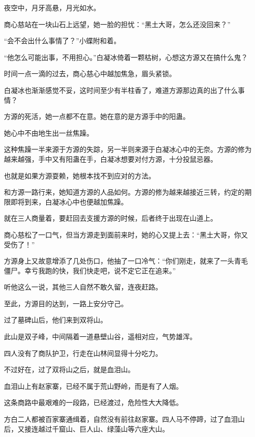 
\begin{this_body}



夜空中，月牙高悬，月光如水。

商心慈站在一块山石上远望，她一脸的担忧：“黑土大哥，怎么还没回来？”

“会不会出什么事情了？”小蝶附和着。

“他怎么可能出事，不用担心。”白凝冰倚着一颗枯树，心想这方源又在搞什么鬼？

时间一点一滴的过去，商心慈心中越加焦急，眉头紧锁。

白凝冰也渐渐感觉不妥，这时间至少有半柱香了，难道方源那边真的出了什么事情？

方源的死活，她一点都不在意。她在意的是方源手中的阳蛊。

她心中不由地生出一丝焦躁。

这种焦躁一半来源于方源的失踪，另一半则来源于白凝冰心中的无奈。方源的修为越来越强，手中又有阳蛊在手，白凝冰想要对付方源，十分投鼠忌器。

也就是如果方源耍赖，她根本找不到应对的方法。

和方源一路行来，她知道方源的人品如何。方源的修为越来越接近三转，约定的期限即将到来，白凝冰心中也便越加焦躁。

就在三人商量着，要赶回去支援方源的时候，后者终于出现在山道上。

商心慈松了一口气，但当方源走到面前来时，她的心又提上去：“黑土大哥，你又受伤了！”

方源身上又故意增添了几处伤口，他抽了一口冷气：“你们刚走，就来了一头青毛僵尸。幸亏我跑的快，我们快走吧，说不定它正在追来。”

听他这么一说，其他三人自然不敢久留，连夜赶路。

至此，方源目的达到，一路上安分守己。

过了墓碑山后，他们来到双将山。

此山是双子峰，中间隔着一道悬壁山谷，遥相对应，气势雄浑。

四人没有了商队护卫，行走在山林间显得十分吃力。

不过好在，过了双将山之后，就是血泪山。

血泪山上有赵家寨，已经不属于荒山野岭，而是有了人烟。

这条商路中最艰难的一段路，已经渡过，危险性大大降低。

方白二人都被百家寨通缉着，自然没有前往赵家寨。四人马不停蹄，过了血泪山后，又接连越过千窟山、巨人山、绿藻山等六座大山。


\end{this_body}
